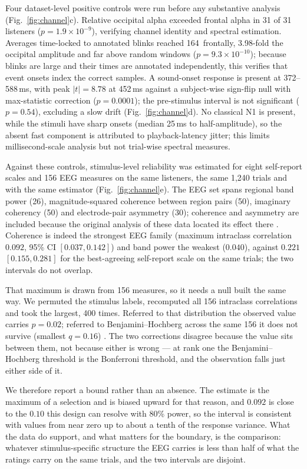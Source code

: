 Four dataset-level positive controls were run before any substantive analysis
(Fig.~\ref{fig:channel}c). Relative occipital alpha exceeded frontal alpha in
31 of 31 listeners ($p = 1.9 \times 10^{-9}$), verifying channel identity and
spectral estimation. Averages time-locked to annotated blinks reached 164\,\uV{}
frontally, 3.98-fold the occipital amplitude and far above random windows
($p = 9.3 \times 10^{-10}$); because blinks are large and their times are annotated
independently, this verifies that event onsets index the correct samples. A
sound-onset response is present at 372--588\,ms, with peak $|t| = 8.78$ at 452\,ms
against a subject-wise sign-flip null with max-statistic correction
\citep{maris2007} ($p = 0.0001$); the pre-stimulus interval is not significant
($p = 0.54$), excluding a slow drift (Fig.~\ref{fig:channel}d). No classical N1
is present, while the stimuli have sharp onsets (median 25\,ms to half-amplitude),
so the absent fast component is attributed to playback-latency jitter; this limits
millisecond-scale analysis but not trial-wise spectral measures.

Against these controls, stimulus-level reliability was estimated for eight
self-report scales and 156 EEG measures on the same listeners, the same 1,240
trials and with the same estimator (Fig.~\ref{fig:channel}e). The EEG set spans
regional band power (26), magnitude-squared coherence between region pairs (50),
imaginary coherency (50) and electrode-pair asymmetry (30); coherence and asymmetry
are included because the original analysis of these data located its effect there
\citep{daly2014}. Coherence is indeed the strongest EEG family (maximum intraclass
correlation $0.092$, 95\% CI $[0.037, 0.142]$) and band power the weakest
($0.040$), against $0.221$ $[0.155, 0.281]$ for the best-agreeing self-report scale
on the same trials; the two intervals do not overlap.

That maximum is drawn from 156 measures, so it needs a null built the same way. We
permuted the stimulus labels, recomputed all 156 intraclass correlations and took
the largest, 400 times. Referred to that distribution the observed value carries
$p = 0.02$; referred to Benjamini--Hochberg across the same 156 it does not survive
(smallest $q = 0.16$) \citep{benjamini1995}. The two corrections disagree because
the value sits between them, not because either is wrong --- at rank one the
Benjamini--Hochberg threshold is the Bonferroni threshold, and the observation
falls just either side of it.

We therefore report a bound rather than an absence. The estimate is the maximum of
a selection and is biased upward for that reason, and $0.092$ is close to the
$0.10$ this design can resolve with 80\% power, so the interval is consistent with
values from near zero up to about a tenth of the response variance. What the data
do support, and what matters for the boundary, is the comparison: whatever
stimulus-specific structure the EEG carries is less than half of what the ratings
carry on the same trials, and the two intervals are disjoint.


